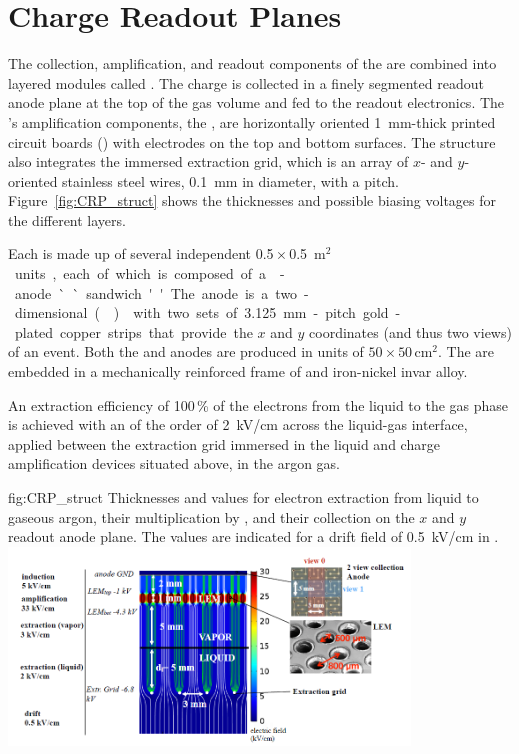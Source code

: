 \section{Charge Readout Planes}
\label{sec:dp-execsum-crp}

The  collection, amplification, and readout components of the  are combined into  layered modules called . The charge is collected in a finely segmented readout anode plane at the top of the gas volume and fed to the  readout electronics. The  's amplification components, the , are horizontally oriented \SI{1}{mm}-thick printed circuit boards () with electrodes on the top and bottom surfaces.  
The  structure also integrates the immersed extraction grid, which is an array of $x$- and $y$-oriented stainless steel wires, \SI{0.1}{mm} in diameter, with a \dpstrippitch pitch. Figure~\ref{fig:CRP_struct} shows the thicknesses and possible biasing voltages for the different  layers.

Each  is made up of several independent \num{0.5}\,$\times$\,\SI{0.5}{m$^2$} units, each of which is composed  of a -anode ``sandwich.''  
The anode is a two-dimensional (\twod)  with two sets of \SI{3.125}{mm}-pitch gold-plated copper strips that provide the $x$ and $y$ coordinates (and thus two views) of an event. Both the  and anodes are produced in units of $50 \times 50\, $cm$^2$. 
The  are embedded in a mechanically reinforced frame of \frfour and iron-nickel invar alloy. 

An extraction efficiency of \num{100}\,\% of the electrons from the liquid to the gas phase is achieved with an \efield of the order of \SI{2}{kV/cm} across the liquid-gas interface, applied between the  extraction grid immersed in the liquid and charge amplification devices situated above, in the argon gas. 

\begin{dunefigure}{fig:CRP_struct}
{Thicknesses and  values for electron extraction from liquid to gaseous argon, their  multiplication by , and their collection on the $x$ and $y$ readout anode plane. The  values are indicated for a drift field of \SI{0.5}{kV/cm} in .}
\includegraphics[width=0.8\textwidth]{graphics/CRP_gaps.png}
\end{dunefigure}


